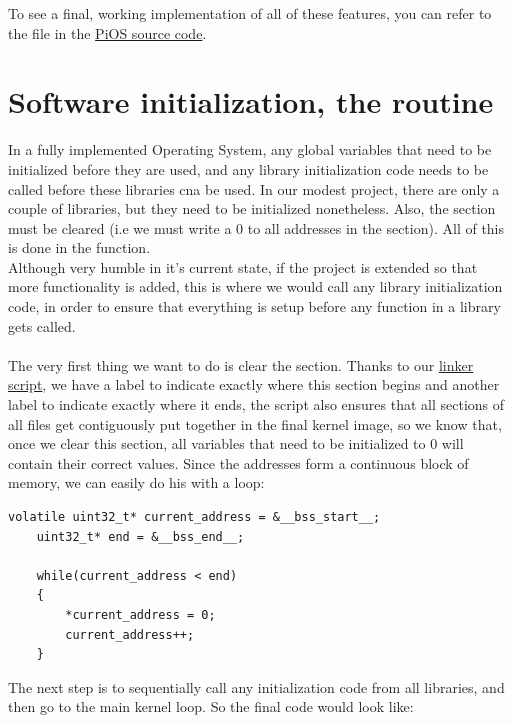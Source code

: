 \documentclass[12pt, svgnames]{book}
\begin{document}
 To see a final, working implementation of all of these features, you can refer to the \href{https://github.com/Makogan/PiOS/blob/master/source/boot/boot.S}{} file in the \href{https://github.com/Makogan/PiOS/tree/master/source}{PiOS source code}.

\section{Software initialization, the  routine}

In a fully implemented Operating System, any global variables that need to be initialized before they are used, and any library initialization code needs to be called before these libraries cna be used. In our modest project, there are only a couple of libraries, but they need to be initialized nonetheless. Also, the  section must be cleared (i.e we must write a 0 to all addresses in the section). All of this is done in the  function.
\\
Although very humble in it's current state, if the project is extended so that more functionality is added, this is where we would call any library initialization code, in order to ensure that everything is setup before any function in a library gets called. 
\\~\\
The very first thing we want to do is clear the  section. Thanks to our \hyperlink{linker script}{linker script}, we have a label to indicate exactly where this section begins and another label to indicate exactly where it ends, the script also ensures that all  sections of all files get contiguously put together in the final kernel image, so we know that, once we clear this section, all variables that need to be initialized to 0 will contain their correct values. Since the addresses form a continuous block of memory, we can easily do his with a loop:

\begin{lstlisting}[style = C]
	volatile uint32_t* current_address = &__bss_start__;
	uint32_t* end = &__bss_end__;
	
	while(current_address < end)
	{
		*current_address = 0;
		current_address++;
	}
\end{lstlisting}

The next step is to sequentially call any initialization code from all libraries, and then go to the main kernel loop. So the final code would look like:
\end{document}
